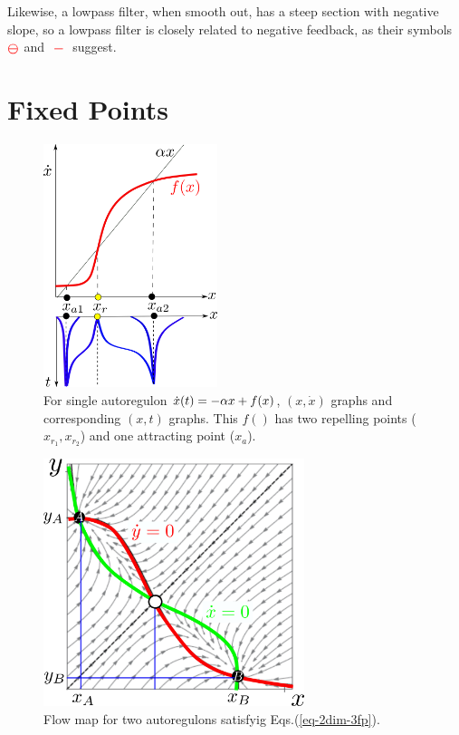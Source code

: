 Likewise,
a lowpass filter, when smooth out,
has a steep section with negative
slope, so a lowpass filter is closely related to negative feedback, as their 
symbols ${\color{red}\bm\ominus}$
and ${\color{red}\bm{\;-\;}}$ suggest.

\section{Fixed Points}

\begin{figure}[h!]
\centering
\includegraphics[width=2in]
{autoregulons/source-sink-source.png}
\caption{For single autoregulon $\dot{x}(t)=-\alpha x + f(x)$, $(x, \dot{x})$ graphs and 
corresponding $(x,t)$ graphs. This $f()$ has
two repelling  points ($x_{r_1}, x_{r_2}$) 
and one attracting  point ($x_a$).
}
\label{fig-source-sink-source}
\end{figure}

\begin{figure}[h!]
\centering
\includegraphics[width=3in]
{autoregulons/2dim-3fp.png}
\caption{Flow map for two autoregulons satisfyig Eqs.(\ref{eq-2dim-3fp}).}
\label{fig-2dim-3fp}
\end{figure}

